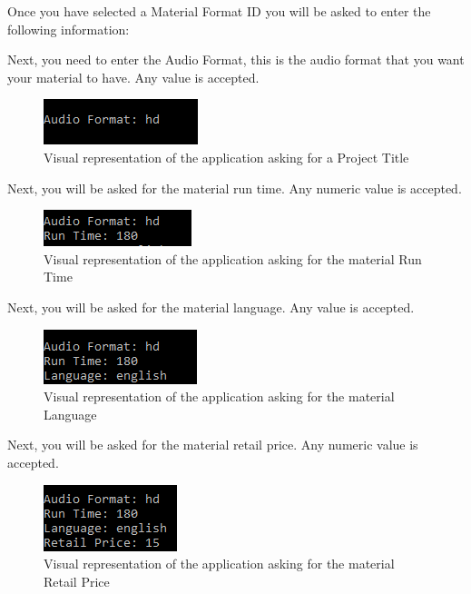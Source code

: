 \documentclass[
  english,
  a4paper,
,tablecaptionabove
]{scrartcl}
\begin{document}
Once you have selected a Material Format ID you will be asked to enter
the following information:

Next, you need to enter the Audio Format, this is the audio format that
you want your material to have. Any value is accepted.

\begin{figure}
\centering
\includegraphics{images/user-guide/maintenance-mode/add-material-audio-format.png}
\caption{Visual representation of the application asking for a Project
Title}
\end{figure}

Next, you will be asked for the material run time. Any numeric value is
accepted.

\begin{figure}
\centering
\includegraphics{images/user-guide/maintenance-mode/add-material-run-time.png}
\caption{Visual representation of the application asking for the
material Run Time}
\end{figure}

Next, you will be asked for the material language. Any value is
accepted.

\begin{figure}
\centering
\includegraphics{images/user-guide/maintenance-mode/add-material-language.png}
\caption{Visual representation of the application asking for the
material Language}
\end{figure}

Next, you will be asked for the material retail price. Any numeric value
is accepted.

\begin{figure}
\centering
\includegraphics{images/user-guide/maintenance-mode/add-material-retail-price.png}
\caption{Visual representation of the application asking for the
material Retail Price}
\end{figure}
\end{document}
